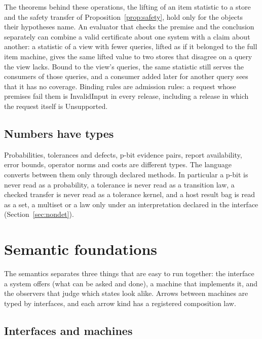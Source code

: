 \documentclass[11pt]{article}
\theoremstyle{definition}
\theoremstyle{plain}
\begin{document}
The theorems behind these operations, the lifting of an item statistic to a store and the safety
transfer of Proposition~\ref{prop:safety}, hold only for the objects their hypotheses name. An
evaluator that checks the premise and the conclusion separately can combine a valid certificate
about one system with a claim about another: a statistic of a view with fewer queries, lifted as if
it belonged to the full item machine, gives the same lifted value to two stores that disagree on a
query the view lacks. Bound to the view's queries, the same statistic still serves the consumers of
those queries, and a consumer added later for another query sees that it has no coverage. Binding
rules are admission rules: a request whose premises fail them is InvalidInput in every release,
including a release in which the request itself is Unsupported.

\subsection{Numbers have types}

Probabilities, tolerances and defects, p-bit evidence pairs, report availability, error bounds,
operator norms and costs are different types. The language converts between them only through
declared methods. In particular a p-bit is never read as a probability, a tolerance is never read
as a transition law, a checked transfer is never read as a tolerance kernel, and a host result bag
is read as a set, a multiset or a law only under an interpretation declared in the interface
(Section~\ref{sec:nondet}).

\section{Semantic foundations}\label{sec:found}

The semantics separates three things that are easy to run together: the interface a system
offers (what can be asked and done), a machine that implements it, and the observers that judge
which states look alike. Arrows between machines are typed by interfaces, and each arrow kind
has a registered composition law.

\subsection{Interfaces and machines}
\end{document}
